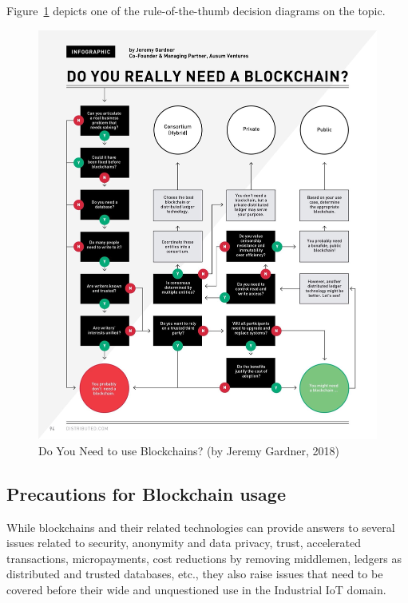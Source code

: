 \documentclass[a4paper]{article}
\begin{document}
Figure~\ref{fig:BC_Do_You_Need} depicts one of the rule-of-the-thumb decision diagrams on the topic.
\begin{figure}[H]
    \centering
    \includegraphics[width=1\textwidth]{figures/DoYouNeedBC.jpg}
    \caption{Do You Need to use Blockchains? (by Jeremy Gardner, 2018)}
    \label{fig:BC_Do_You_Need}
\end{figure}


\subsection{Precautions for Blockchain usage}

While blockchains and their related technologies can provide answers to several issues related to security, anonymity and data privacy, trust, accelerated transactions, micropayments, cost reductions by removing middlemen, ledgers as distributed and trusted databases, etc., they also raise issues that need to be covered before their wide and unquestioned use in the Industrial IoT domain.
\end{document}
